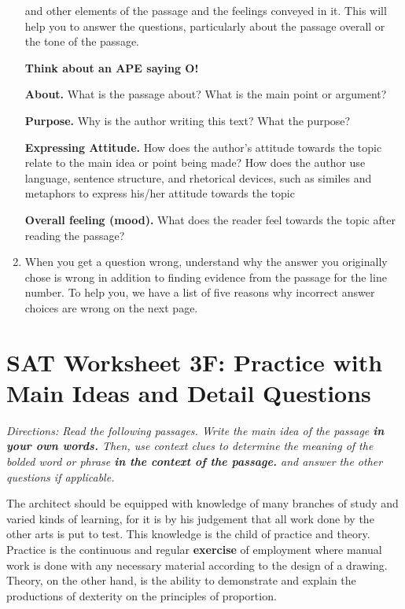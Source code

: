 \documentclass[12pt]{book}
\renewcommand{\indent}{\hspace{1cm}}
\newcommand{\longline}{\underline{\hspace{2in}} }
\begin{document}
\begin{enumerate}[leftmargin=0cm,labelwidth=\itemindent,labelsep=0cm,align=left,label={\bfseries Strategy \#\arabic*:\ }]
\longline and other elements of the passage and the feelings conveyed in it. This will help you to answer the questions, particularly about the passage overall or the tone of the passage. 

\centerline{\textbf{Think about an APE saying O!}}

\textbf{About.} What is the passage about? What is the main point or argument? 

\bigskip
\textbf{Purpose.} Why is the author writing this text? What the purpose?

\bigskip
\textbf{Expressing Attitude.} How does the author's attitude towards the topic relate to the main idea or point being made? How does the author use language, sentence structure, and rhetorical devices, such as similes and metaphors to express his/her attitude towards the topic

\bigskip
\textbf{Overall feeling (mood).} What does the reader feel towards the topic after reading the passage? 

\bigskip
\item When you get a question wrong, understand why the answer you originally chose is wrong in addition to finding evidence from the passage for the line number. To help you, we have a list of five reasons why incorrect answer choices are wrong on the next page. 
\end{enumerate}

\newpage

\section[Main Ideas and Details]{SAT Worksheet 3F: Practice with Main Ideas and Detail Questions}
\textit{Directions: Read the following passages. Write the main idea of the passage \textbf{in your own words.} Then, use context clues to determine the meaning of the bolded word or phrase \textbf{in the context of the passage.} and answer the other questions if applicable.}

\bigskip
\begin{linenumbers*}
\modulolinenumbers[5]
\indent The architect should be equipped with knowledge of many branches of study and varied kinds of learning, for it is by his judgement that all work done by the other arts is put to test. This knowledge is the child of practice and theory. Practice is the continuous and regular \textbf{exercise} of employment where manual work is done with any necessary material according to the design of a drawing. Theory, on the other hand, is the ability to demonstrate and explain the productions of dexterity on the principles of proportion.
\end{linenumbers*}
\end{document}
